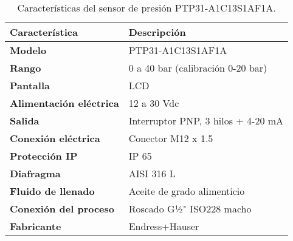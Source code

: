\begin{table}[H]
    \centering
    \caption{Características del sensor de presión PTP31-A1C13S1AF1A. }
    \label{table:sensor_transmisor_presion}
    \begin{tabular}{| L{6cm} | L{6cm} |}
        \hline
        \textbf{Característica}         & \textbf{Descripción}               \\
        \hline
        \textbf{Modelo}                 & PTP31-A1C13S1AF1A                  \\
        \hline
        \textbf{Rango}                  & 0 a 40 bar (calibración 0-20 bar)  \\
        \hline
        \textbf{Pantalla}               & LCD                                \\
        \hline
        \textbf{Alimentación eléctrica} & 12 a 30 Vdc                        \\
        \hline
        \textbf{Salida}                 & Interruptor PNP, 3 hilos + 4-20 mA \\
        \hline
        \textbf{Conexión eléctrica}     & Conector M12 x 1.5                 \\
        \hline
        \textbf{Protección IP}          & IP 65                              \\
        \hline
        \textbf{Diafragma}              & AISI 316 L                         \\
        \hline
        \textbf{Fluido de llenado}      & Aceite de grado alimenticio        \\
        \hline
        \textbf{Conexión del proceso}   & Roscado G½" ISO228 macho           \\
        \hline
        \textbf{Fabricante}             & Endress+Hauser                     \\
        \hline
    \end{tabular}
\end{table}

